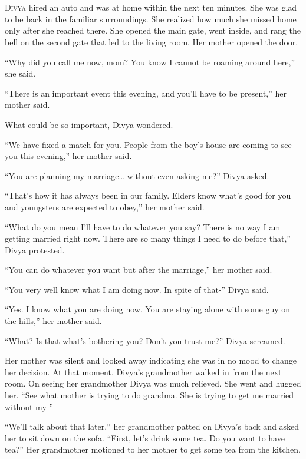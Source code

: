 \chapter{}

\lettrine{D}{ivya} hired an auto and was at home within the next ten minutes. She was glad to
be back in the familiar surroundings. She realized how much she missed home only
after she reached there. She opened the main gate, went inside, and rang the
bell on the second gate that led to the living room. Her mother opened the door.

“Why did you call me now, mom? You know I cannot be roaming around here,” she
said.

“There is an important event this evening, and you'll have to be present,” her
mother said.

What could be so important, Divya wondered.

“We have fixed a match for you. People from the boy's house are coming to see
you this evening,” her mother said.

“You are planning my marriage… without even asking me?” Divya asked.

“That's how it has always been in our family. Elders know what's good for you
and youngsters are expected to obey,” her mother said.

“What do you mean I'll have to do whatever you say? There is no way I am getting
married right now. There are so many things I need to do before that,” Divya
protested.

“You can do whatever you want but after the marriage,” her mother said.

“You very well know what I am doing now. In spite of that-” Divya said.

“Yes. I know what you are doing now. You are staying alone with some guy on the
hills,” her mother said.

“What? Is that what's bothering you? Don't you trust me?” Divya screamed.

Her mother was silent and looked away indicating she was in no mood to change
her decision. At that moment, Divya's grandmother walked in from the next room.
On seeing her grandmother Divya was much relieved. She went and hugged her. “See
what mother is trying to do grandma. She is trying to get me married without
my-”

“We'll talk about that later,” her grandmother patted on Divya's back and asked
her to sit down on the sofa. “First, let's drink some tea. Do you want to have
tea?” Her grandmother motioned to her mother to get some tea from the kitchen.

